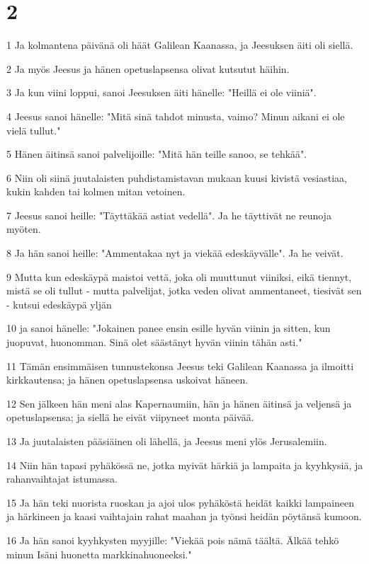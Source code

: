 \chapter{2}

\par 1 Ja kolmantena päivänä oli häät Galilean Kaanassa, ja Jeesuksen äiti oli siellä.
\par 2 Ja myös Jeesus ja hänen opetuslapsensa olivat kutsutut häihin.
\par 3 Ja kun viini loppui, sanoi Jeesuksen äiti hänelle: "Heillä ei ole viiniä".
\par 4 Jeesus sanoi hänelle: "Mitä sinä tahdot minusta, vaimo? Minun aikani ei ole vielä tullut."
\par 5 Hänen äitinsä sanoi palvelijoille: "Mitä hän teille sanoo, se tehkää".
\par 6 Niin oli siinä juutalaisten puhdistamistavan mukaan kuusi kivistä vesiastiaa, kukin kahden tai kolmen mitan vetoinen.
\par 7 Jeesus sanoi heille: "Täyttäkää astiat vedellä". Ja he täyttivät ne reunoja myöten.
\par 8 Ja hän sanoi heille: "Ammentakaa nyt ja viekää edeskäyvälle". Ja he veivät.
\par 9 Mutta kun edeskäypä maistoi vettä, joka oli muuttunut viiniksi, eikä tiennyt, mistä se oli tullut - mutta palvelijat, jotka veden olivat ammentaneet, tiesivät sen - kutsui edeskäypä yljän
\par 10 ja sanoi hänelle: "Jokainen panee ensin esille hyvän viinin ja sitten, kun juopuvat, huonomman. Sinä olet säästänyt hyvän viinin tähän asti."
\par 11 Tämän ensimmäisen tunnustekonsa Jeesus teki Galilean Kaanassa ja ilmoitti kirkkautensa; ja hänen opetuslapsensa uskoivat häneen.
\par 12 Sen jälkeen hän meni alas Kapernaumiin, hän ja hänen äitinsä ja veljensä ja opetuslapsensa; ja siellä he eivät viipyneet monta päivää.
\par 13 Ja juutalaisten pääsiäinen oli lähellä, ja Jeesus meni ylös Jerusalemiin.
\par 14 Niin hän tapasi pyhäkössä ne, jotka myivät härkiä ja lampaita ja kyyhkysiä, ja rahanvaihtajat istumassa.
\par 15 Ja hän teki nuorista ruoskan ja ajoi ulos pyhäköstä heidät kaikki lampaineen ja härkineen ja kaasi vaihtajain rahat maahan ja työnsi heidän pöytänsä kumoon.
\par 16 Ja hän sanoi kyyhkysten myyjille: "Viekää pois nämä täältä. Älkää tehkö minun Isäni huonetta markkinahuoneeksi."
